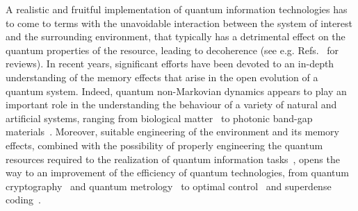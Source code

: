 \documentclass[prl,twocolumn,aps,floatfix,showpacs,tightenlines,superscriptaddress,amsmath,amssymb,amsfonts,10pt]{revtex4-1}
\begin{document}
A realistic and fruitful implementation of quantum information technologies has to come to terms with the unavoidable interaction between the system of interest and the surrounding environment, that typically has a detrimental effect on the quantum properties of the resource, leading to decoherence (see e.g. Refs.~\cite{Zurek,1464-4266-7-4-R01,Schlosshauer2005} for reviews).
In recent years, significant efforts have been devoted to an in-depth understanding of the memory effects that arise in the open evolution of a quantum system. Indeed, quantum non-Markovian dynamics appears to play an important role in the understanding the behaviour of a variety of natural and artificial systems, ranging from biological matter~\cite{Lambert2013, Thorwart2009234, Chin2013, doi:10.1080/00405000.2013.829687} to photonic band-gap materials~\cite{6833787}. Moreover, suitable engineering of the environment and its memory effects, combined with the possibility of properly engineering the quantum resources required to the realization of quantum information tasks~\cite{PhysRevA.76.022301, PhysRevA.81.012333, PhysRevA.82.062329, PhysRevA.93.033807}, opens the way to an improvement of the efficiency of quantum technologies, from quantum cryptography~\cite{PhysRevA.83.042321} and quantum metrology~\cite{PhysRevLett.109.233601} to optimal control~\cite{PhysRevA.85.032321, 6870898, 1367-2630-17-6-063031} and superdense coding~\cite{0295-5075-114-1-10005}.
\end{document}
